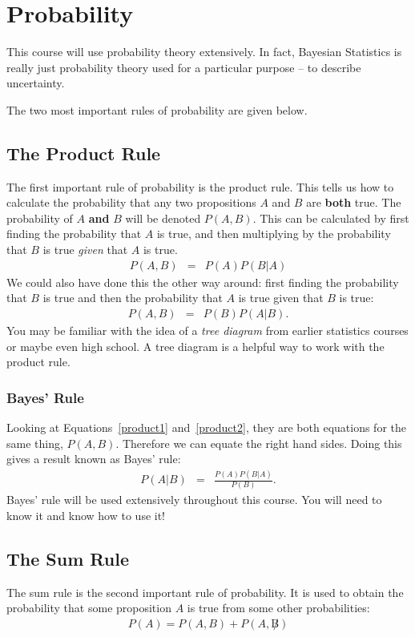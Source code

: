 \chapter{Probability}
This course will use probability theory extensively. In fact, Bayesian
Statistics is really just probability theory used for a particular purpose --
to describe uncertainty.

The two most important rules of probability are given below.

\section{The Product Rule}
The first important rule of probability is the
product rule. This tells us how to calculate the probability that any two
propositions $A$ and $B$ are {\bf both} true. The probability of $A$ {\bf and}
$B$ will be denoted $P(A, B)$. This can be calculated by first finding the
probability that $A$ is true, and then multiplying by the probability that $B$
is true {\it given} that $A$ is true.
\begin{eqnarray}
P(A, B) &=& P(A)P(B|A)\label{product1}
\end{eqnarray}
We could also have done this the other way around: first finding the
probability that $B$ is true and then the probability that $A$ is true given
that $B$ is true:
\begin{eqnarray}
P(A, B) &=& P(B)P(A|B).\label{product2}
\end{eqnarray}
You may be familiar with the idea of a {\it tree diagram} from earlier
statistics courses or maybe even high school. A tree diagram is a helpful way
to work with the product rule.


\subsection{Bayes' Rule}
Looking at Equations~\ref{product1} and~\ref{product2}, they are both equations
for the same
thing, $P(A,B)$. Therefore we can equate the right hand sides. Doing this gives
a result known as Bayes' rule:
\begin{eqnarray}
P(A|B) &=& \frac{P(A)P(B|A)}{P(B)}. \label{bayes}
\end{eqnarray}
Bayes' rule will be used extensively throughout this course. You will need to
know it and know how to use it!

\section{The Sum Rule}
The sum rule is the second important rule of probability. It is used to obtain
the probability that some proposition $A$ is true from some other
probabilities:
\begin{eqnarray}
P(A) = P(A, B) + P(A, \not B)
\end{eqnarray}

